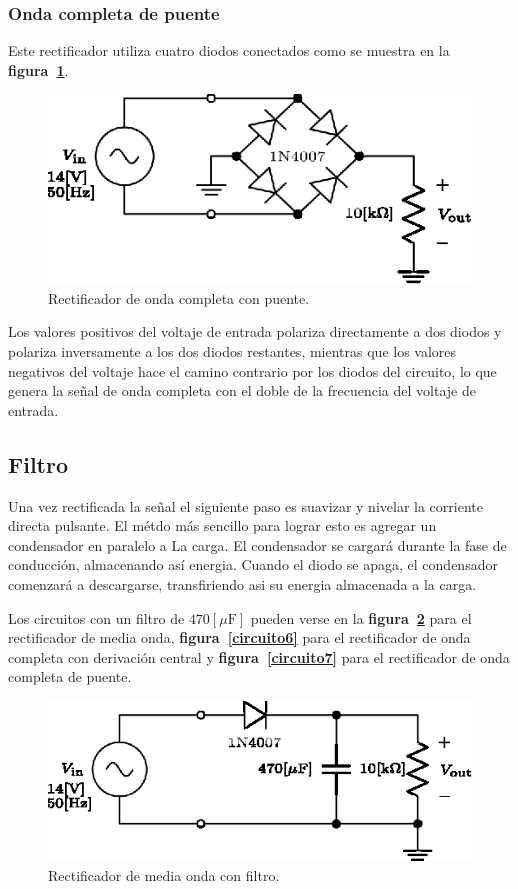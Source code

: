 \documentclass[letter,twoside,11pt]{article}
\begin{document}
\subsubsection{Onda completa de puente}
Este rectificador utiliza cuatro diodos conectados como se muestra en la
\textbf{figura~\ref{circuito4}}.

\begin{figure}[!h]
\centering
\includegraphics[scale=1.25]{04.onda_completa1.eps}
\caption{Rectificador de onda completa con puente.}
\label{circuito4}
\end{figure}

Los valores positivos del voltaje de entrada polariza directamente a dos diodos
y polariza inversamente a los dos diodos restantes, mientras que los valores
negativos del voltaje hace el camino contrario por los diodos del circuito, lo
que genera la señal de onda completa con el doble de la frecuencia del voltaje
de entrada.

\subsection{Filtro}
Una vez rectificada la señal el siguiente paso es suavizar y nivelar la
corriente directa pulsante. El métdo más sencillo para lograr esto es agregar un
condensador en paralelo a La carga. El condensador se cargará durante la fase de
conducción, almacenando así energia. Cuando el diodo se apaga, el condensador
comenzará a descargarse, transfiriendo asi su energia almacenada a la carga.

Los circuitos con un filtro de $470[\mu\text{F}]$ pueden verse en la
\textbf{figura~\ref{circuito5}} para el rectificador de media onda,
\textbf{figura~\ref{circuito6}} para el rectificador de onda completa con
derivación central y \textbf{figura~\ref{circuito7}} para el rectificador de
onda completa de puente.

\begin{figure}[!h]
\centering
\includegraphics[scale=1.25]{05.media_onda2.eps}
\caption{Rectificador de media onda con filtro.}
\label{circuito5}
\end{figure}
\end{document}
